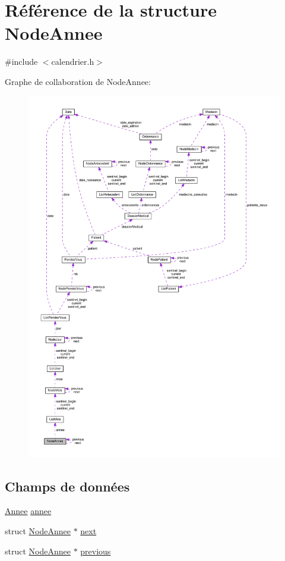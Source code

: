 \hypertarget{struct_node_annee}{\section{Référence de la structure Node\-Annee}
\label{struct_node_annee}
}


{\ttfamily \#include $<$calendrier.\-h$>$}



Graphe de collaboration de Node\-Annee\-:
\nopagebreak
\begin{figure}[H]
\begin{center}
\leavevmode
\includegraphics[width=350pt]{struct_node_annee__coll__graph}
\end{center}
\end{figure}
\subsection*{Champs de données}
\begin{DoxyCompactItemize}
\item 
\hyperlink{calendrier_8h_a8e119d682702ebf078b3235b4c0fe464}{Annee} \hyperlink{struct_node_annee_aa0898ccf3eb95fa2dc84150d887b55c1}{annee}
\item 
struct \hyperlink{struct_node_annee}{Node\-Annee} $\ast$ \hyperlink{struct_node_annee_a1cb22d42269d482585fba555db38334e}{next}
\item 
struct \hyperlink{struct_node_annee}{Node\-Annee} $\ast$ \hyperlink{struct_node_annee_aebffe5024c759df4300746c6b1034ed3}{previous}
\end{DoxyCompactItemize}


